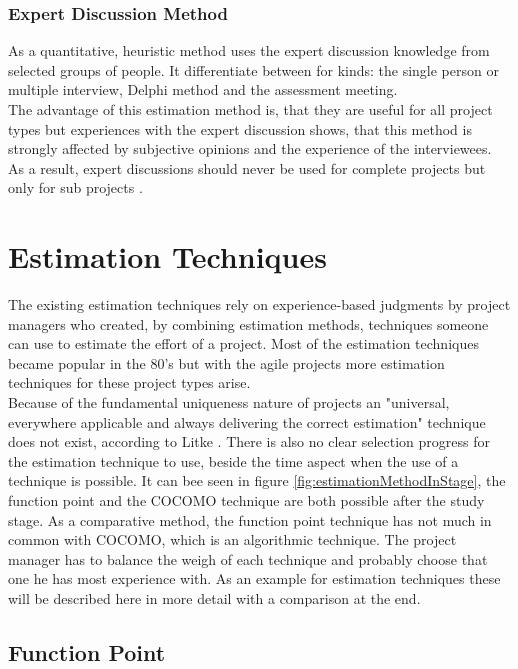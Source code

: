\subsubsection{Expert Discussion Method}

As a quantitative, heuristic method uses the expert discussion knowledge from selected groups of people. It differentiate between for kinds: the single person or multiple interview, Delphi method and the assessment meeting.\\
The advantage of this estimation method is, that they are useful for all project types but experiences with the expert discussion shows, that this method is strongly affected by subjective opinions and the experience of the interviewees. As a result, expert discussions should never be used for complete projects but only for sub projects \cite{itplanung}.\\

\section{Estimation Techniques}

The existing estimation techniques rely on experience-based judgments by project managers
who created, by combining estimation methods, techniques someone can use to estimate the effort of a project. Most of the estimation techniques became popular in the 80's but with the agile projects more estimation techniques for these project types arise. \\
Because of the fundamental uniqueness nature of projects an "universal, everywhere applicable and always delivering the correct estimation" technique does not exist, according to Litke \cite{litke}. There is also no clear selection progress for the estimation technique to use, beside the time aspect when the use of a technique is possible. It can bee seen in figure \ref{fig:estimationMethodInStage}, the function point and the COCOMO technique are both possible after the study stage. As a comparative method, the function point technique has not much in common with COCOMO, which is an algorithmic technique. The project manager has to balance the weigh of each technique and probably choose that one he has most experience with. As an example for estimation techniques these will be described here in more detail with a comparison at the end.


\subsection{Function Point} \label{FPMethod}

